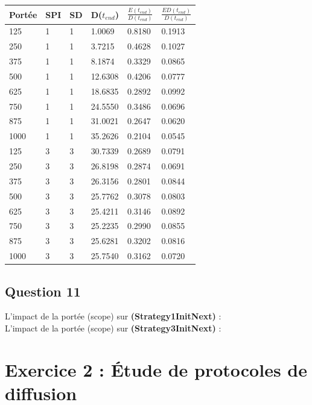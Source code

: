 \documentclass[10pt]{report}
\begin{document}
\begin{center}
\captionsetup{type=figure}
\begin{tabular}{|l|l|l|l|l|l|} \hline
  	Portée & SPI & SD & D($t_{end}$) & $\frac{E(t_{end})}{D(t_{end})}$ & $\frac{ED(t_{end})}{D(t_{end})}$\\ \hline
	125 & 1 & 1 & 1.0069 & 0.8180 & 0.1913\\ \hline
	250 & 1 & 1 & 3.7215 & 0.4628 & 0.1027\\ \hline
	375 & 1 & 1 & 8.1874 & 0.3329 & 0.0865\\ \hline
	500 & 1 & 1 & 12.6308 & 0.4206 & 0.0777\\ \hline
	625 & 1 & 1 & 18.6835 & 0.2892 & 0.0992\\ \hline
	750 & 1 & 1 & 24.5550 & 0.3486 & 0.0696\\ \hline
	875 & 1 & 1 & 31.0021 & 0.2647 & 0.0620\\ \hline
	1000 & 1 & 1 & 35.2626 & 0.2104 & 0.0545\\ \hline
	125 & 3 & 3 & 30.7339 & 0.2689 & 0.0791\\ \hline
	250 & 3 & 3 & 26.8198 & 0.2874 & 0.0691\\ \hline
	375 & 3 & 3 & 26.3156 & 0.2801 & 0.0844\\ \hline
	500 & 3 & 3 & 25.7762 & 0.3078 & 0.0803\\ \hline
	625 & 3 & 3 & 25.4211 & 0.3146 & 0.0892\\ \hline
	750 & 3 & 3 & 25.2235 & 0.2990 & 0.0855\\ \hline
	875 & 3 & 3 & 25.6281 & 0.3202 & 0.0816\\ \hline
	1000 & 3 & 3 & 25.7540 & 0.3162 & 0.0720\\ \hline
\end{tabular}
\end{center}

\subsection{Question 11}

L'impact de la portée (scope) sur \textbf{(Strategy1InitNext)} :\\

L'impact de la portée (scope) sur \textbf{(Strategy3InitNext)} :\\

\newpage
\section{Exercice 2 : Étude de protocoles de diffusion}
\end{document}
